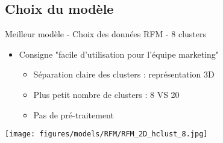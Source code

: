 \documentclass[10pt]{beamer}
\begin{document}
\subsection{Choix du modèle}
\begin{frame}{Meilleur modèle - Choix des données}
RFM - 8 clusters
    \begin{itemize}
        \item Consigne "facile d’utilisation pour l’équipe marketing"
            \begin{itemize}
                \item Séparation claire des clusters : représentation 3D
                \item Plus petit nombre de clusters : 8 VS 20
                \item Pas de pré-traitement
            \end{itemize}
    \end{itemize}
    \begin{center}
        \texttt{[image: figures/models/RFM/RFM\_2D\_hclust\_8.jpg]}
    \end{center}
\end{frame}
\end{document}
